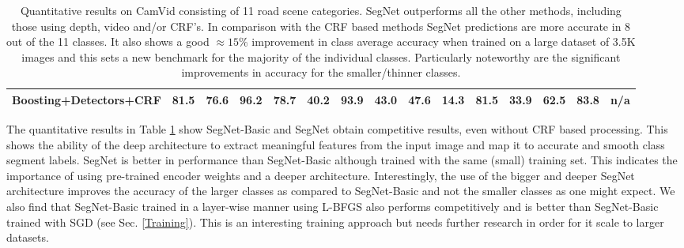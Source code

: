 {\begin{landscape}
\begin{table}[th]
{{\begin{tabular}{c|c|c|c|c|c|c|c|c|c|c|c|ccc}
Boosting+Detectors+CRF \citep{LadickyECCV}   & 81.5     & 76.6 & 96.2 & 78.7 & 40.2        & 93.9 & 43.0       & 47.6  & 14.3        & 81.5     & 33.9      & 62.5       & 83.8    & n/a    \\ \hline
\end{tabular}
}}
\caption[CamVid quantitative results.]{Quantitative results on CamVid \citep{brostow2009semantic} consisting of 11 road scene categories. SegNet outperforms all the other methods, including those using depth, video and/or CRF's. In comparison with the CRF based methods SegNet predictions are more accurate in 8 out of the 11 classes. It also shows a good $\approx 15\%$ improvement in class average accuracy when trained on a large dataset of 3.5K images and this sets a new benchmark for the majority of the individual classes. Particularly noteworthy are the significant improvements in accuracy for the smaller/thinner classes. 
}
\label{CamVidQuant}
\end{table}
\end{landscape}}

The quantitative results in Table \ref{CamVidQuant} show SegNet-Basic and SegNet obtain competitive results, even without CRF based processing. This shows the ability of the deep architecture to extract meaningful features from the input image and map it to accurate and smooth class segment labels. SegNet is better in performance than SegNet-Basic although trained with the same (small) training set. This indicates the importance of using pre-trained encoder weights and a deeper architecture. Interestingly, the use of the bigger and deeper SegNet architecture improves the accuracy of the larger classes as compared to SegNet-Basic and not the smaller classes as one might expect. We also find that SegNet-Basic \citep{SegNetarXiv} trained in a layer-wise manner using L-BFGS \citep{Nocedal} also performs competitively and is better than SegNet-Basic trained with SGD (see Sec. \ref{Training}). This is an interesting training approach but needs further research in order for it scale to larger datasets.

